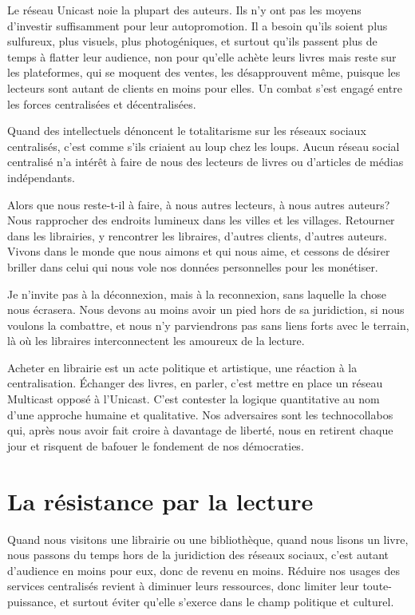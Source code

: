 \documentclass[a5paper, 10pt, twoside]{book}
\let\oldsection\section
\renewcommand{\section}[1]{%
  \oldsection{#1}%
  \par\vspace{\baselineskip}%
}
\begin{document}
Le réseau Unicast noie la plupart des auteurs. Ils n’y ont pas les
moyens d’investir suffisamment pour leur autopromotion. Il a besoin
qu’ils soient plus sulfureux, plus visuels, plus photogéniques, et
surtout qu’ils passent plus de temps à flatter leur audience, non pour
qu’elle achète leurs livres mais reste sur les plateformes, qui se
moquent des ventes, les désapprouvent même, puisque les lecteurs sont
autant de clients en moins pour elles. Un combat s’est engagé entre les
forces centralisées et décentralisées.

Quand des intellectuels dénoncent le totalitarisme sur les réseaux
sociaux centralisés, c’est comme s’ils criaient au loup chez les loups.
Aucun réseau social centralisé n’a intérêt à faire de nous des lecteurs
de livres ou d’articles de médias indépendants.

Alors que nous reste-t-il à faire, à nous autres lecteurs, à nous autres
auteurs? Nous rapprocher des endroits lumineux dans les villes et les
villages. Retourner dans les librairies, y rencontrer les libraires,
d’autres clients, d’autres auteurs. Vivons dans le monde que nous aimons
et qui nous aime, et cessons de désirer briller dans celui qui nous vole
nos données personnelles pour les monétiser.

Je n’invite pas à la déconnexion, mais à la reconnexion, sans laquelle
la chose nous écrasera. Nous devons au moins avoir un pied hors de sa
juridiction, si nous voulons la combattre, et nous n’y parviendrons pas
sans liens forts avec le terrain, là où les libraires interconnectent
les amoureux de la lecture.

Acheter en librairie est un acte politique et artistique, une réaction à
la centralisation. Échanger des livres, en parler, c’est mettre en place
un réseau Multicast opposé à l’Unicast. C’est contester la logique
quantitative au nom d’une approche humaine et qualitative. Nos
adversaires sont les technocollabos qui, après nous avoir fait croire à
davantage de liberté, nous en retirent chaque jour et risquent de
bafouer le fondement de nos démocraties.

\section{\texorpdfstring{La résistance par la
lecture}{    }}\label{la-ruxe9sistance-par-la-lecture}

Quand nous visitons une librairie ou une bibliothèque, quand nous lisons
un livre, nous passons du temps hors de la juridiction des réseaux
sociaux, c’est autant d’audience en moins pour eux, donc de revenu en
moins. Réduire nos usages des services centralisés revient à diminuer
leurs ressources, donc limiter leur toute-puissance, et surtout éviter
qu’elle s’exerce dans le champ politique et culturel.
\end{document}
